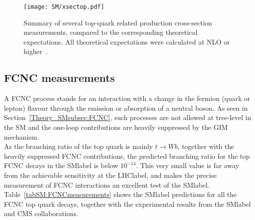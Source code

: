 \begin{figure}[htbp]
    \RawFloats
    \begin{center}
    \texttt{[image: SM/xsectop.pdf]}
    \caption{
        Summary of several top-quark related production cross-section measurements, compared to the corresponding theoretical expectations. All theoretical expectations were calculated at NLO or higher~\cite{ATL-PHYS-PUB-2022-031}.
    }
    \label{figSM:topcrossection}
    \end{center}
\end{figure}

\clearpage
\subsection{FCNC measurements}

A FCNC process stands for an interaction with a change in the fermion (quark or lepton) flavour through
the emission or absorption of a neutral boson. As seen in Section~\ref{Theory_SMsubsec:FCNC}, such processes are not allowed at tree-level in the SM and the one-loop contributions are heavily suppressed by the GIM mechanism.\\

As the branching ratio of the top quark is mainly $t\to Wb$, together with the heavily suppressed FCNC contributions, the predicted branching ratio for the top FCNC decays in the \acrshort{SMlabel} is below $10^{-14}$. This very small value is far away from the achievable sensitivity at the \acrshort{LHClabel}, and makes the precise measurement of FCNC interactions an excellent test of the \acrshort{SMlabel}.\\

Table~\ref{tabSM:FCNCmeasurements} shows the \acrshort{SMlabel} predictions for all the FCNC top quark decays, together with the experimental results from the \acrshort{SMlabel} and CMS collaborations.

